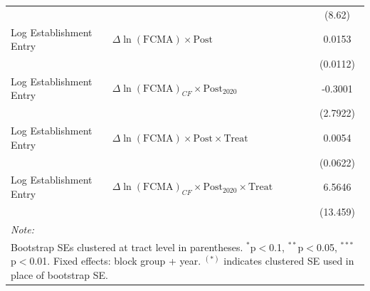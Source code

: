 \begin{table}[!h]
{\begin{tabular}[t]{llc}
 &  & (8.62)\\
Log Establishment Entry & $\Delta\ln(\text{FCMA}) \times \text{Post}$ & 0.0153\\
\addlinespace
 &  & (0.0112)\\
Log Establishment Entry & $\Delta\ln(\text{FCMA})_{CF} \times \text{Post}_{2020}$ & -0.3001\\
 &  & (2.7922)\\
Log Establishment Entry & $\Delta\ln(\text{FCMA}) \times \text{Post} \times \text{Treat}$ & 0.0054\\
 &  & (0.0622)\\
\addlinespace
Log Establishment Entry & $\Delta\ln(\text{FCMA})_{CF} \times \text{Post}_{2020} \times \text{Treat}$ & 6.5646\\
 &  & (13.459)\\
\bottomrule
\multicolumn{3}{l}{\rule{0pt}{1em}\textit{Note: }}\\
\multicolumn{3}{l}{\rule{0pt}{1em}Bootstrap SEs clustered at tract level in parentheses. $^{*}$p$<$0.1, $^{**}$p$<$0.05, $^{***}$p$<$0.01. Fixed effects: block group + year. $^{(*)}$ indicates clustered SE used in place of bootstrap SE.}\\
\end{tabular}}
\end{table}
